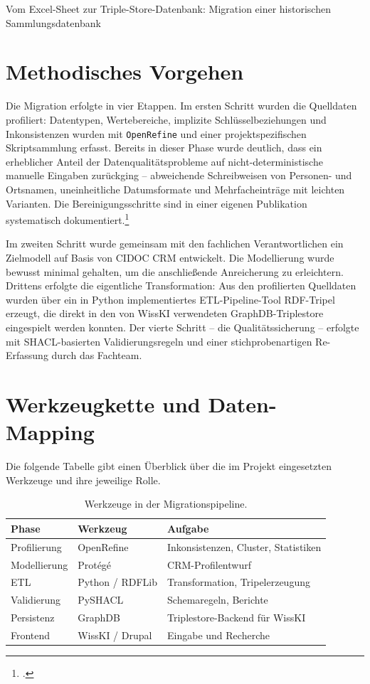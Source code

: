 \begin{beitrag}{Vom Excel-Sheet zur Triple-Store-Datenbank: Migration einer historischen Sammlungsdatenbank}
\section{Methodisches Vorgehen}
Die Migration erfolgte in vier Etappen. Im ersten Schritt wurden die Quelldaten profiliert: Datentypen, Wertebereiche, implizite Schlüsselbeziehungen und Inkonsistenzen wurden mit \texttt{OpenRefine} und einer projektspezifischen Skriptsammlung erfasst. Bereits in dieser Phase wurde deutlich, dass ein erheblicher Anteil der Datenqualitätsprobleme auf nicht-deterministische manuelle Eingaben zurückging -- abweichende Schreibweisen von Personen- und Ortsnamen, uneinheitliche Datumsformate und Mehrfacheinträge mit leichten Varianten. Die Bereinigungsschritte sind in einer eigenen Publikation systematisch dokumentiert.\footcite[22]{castorp2024-cleanup}

Im zweiten Schritt wurde gemeinsam mit den fachlichen Verantwortlichen ein Zielmodell auf Basis von CIDOC CRM entwickelt. Die Modellierung wurde bewusst minimal gehalten, um die anschließende Anreicherung zu erleichtern. Drittens erfolgte die eigentliche Transformation: Aus den profilierten Quelldaten wurden über ein in Python implementiertes ETL-Pipeline-Tool RDF-Tripel erzeugt, die direkt in den von WissKI verwendeten GraphDB-Triplestore eingespielt werden konnten. Der vierte Schritt -- die Qualitätssicherung -- erfolgte mit SHACL-basierten Validierungsregeln und einer stichprobenartigen Re-Erfassung durch das Fachteam.

\section{Werkzeugkette und Daten-Mapping}
Die folgende Tabelle gibt einen Überblick über die im Projekt eingesetzten Werkzeuge und ihre jeweilige Rolle.

\begin{table}[ht]
    \centering
    \begin{tabular}{lll}
        \toprule
        \textbf{Phase} & \textbf{Werkzeug} & \textbf{Aufgabe} \\
        \midrule
        Profilierung & OpenRefine    & Inkonsistenzen, Cluster, Statistiken \\
        Modellierung & Protégé       & CRM-Profilentwurf \\
        ETL          & Python / RDFLib & Transformation, Tripelerzeugung \\
        Validierung  & PySHACL        & Schemaregeln, Berichte \\
        Persistenz   & GraphDB        & Triplestore-Backend für WissKI \\
        Frontend     & WissKI / Drupal & Eingabe und Recherche \\
        \bottomrule
    \end{tabular}
    \caption{Werkzeuge in der Migrationspipeline.}
    \label{tab:p02-werkzeuge}
\end{table}


\end{beitrag}
